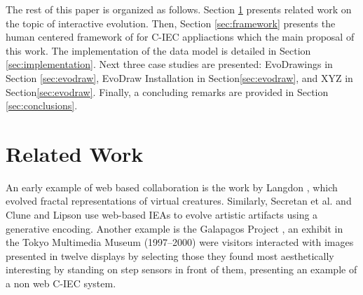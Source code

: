 The rest of this paper is organized as follows.
Section \ref{sec:related} presents related work on the topic 
of interactive evolution. Then, Section \ref{sec:framework} presents the human centered framework of
for C-IEC appliactions which the main proposal of this work. The implementation of the data model
is detailed in Section \ref{sec:implementation}. Next three case studies are presented: EvoDrawings in
Section \ref{sec:evodraw}, EvoDraw Installation in Section\ref{sec:evodraw}, 
and XYZ in Section\ref{sec:evodraw}. Finally, a concluding remarks are provided 
in Section \ref{sec:conclusions}.

\section{Related Work}
\label{sec:related}

An early example of web based collaboration is the work by 
Langdon \cite{langdon:2004}, which evolved fractal representations of virtual creatures. 
Similarly, Secretan et al. \cite{picbreeder} and Clune and Lipson \cite{forms} 
use web-based IEAs to evolve artistic artifacts using a generative encoding.
Another example is the Galapagos Project \cite{sims1997interactivity},
an exhibit in the Tokyo Multimedia Museum (1997--2000) 
were visitors interacted with images presented in 
twelve displays by selecting those they found most aesthetically interesting by standing on
step sensors in front of them, presenting an example of a non web C-IEC system. 

